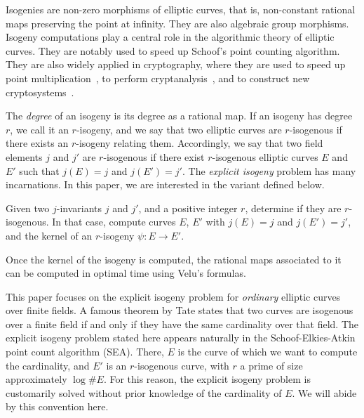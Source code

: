\documentclass{lms}
\begin{document}
Isogenies are non-zero morphisms of elliptic curves, that is,
non-constant rational maps preserving the point at infinity. They are
also algebraic group morphisms. Isogeny computations play a central
role in the algorithmic theory of elliptic curves. They are notably
used to speed up Schoof's point counting
algorithm\cite{schoof85,atkin88,elkies92,schoof95,elkies98}. They are
also widely applied in cryptography, where they are used to speed up
point multiplication~\cite{gallant+lambert+vanstone01,birkner+sica11},
to perform cryptanalysis~\cite{mauer+menezes+teske01}, and to
construct new
cryptosystems~\cite{teske06,charles+lauter+goren09,Stol,defeo+jao+plut12,jao+soukharev2014-signatures}.

The \emph{degree} of an isogeny is its degree as a rational map. If an
isogeny has degree $r$, we call it an $r$-isogeny, and we say that two
elliptic curves are $r$-isogenous if there exists an $r$-isogeny
relating them. Accordingly, we say that two field elements $j$ and
$j'$ are $r$-isogenous if there exist $r$-isogenous elliptic curves
$E$ and $E'$ such that $j(E)=j$ and $j(E')=j'$. The
\emph{explicit isogeny} problem has many incarnations. In this paper,
we are interested in the variant defined below.

\begin{prob} \label{prob:isogeny-problem}
  Given two $j$-invariants $j$ and $j'$, and a positive integer
  $r$, determine if they are $r$-isogenous. In that case, compute
  curves $E$, $E'$ with $j(E)=j$ and $j(E')=j'$, and the
  kernel of an $r$-isogeny $ψ:E\to E'$.
\end{prob}

Once the kernel of the isogeny is computed, the rational maps
associated to it can be computed in optimal time using Velu's
formulas\cite{velu71}.

This paper focuses on the explicit isogeny problem for \emph{ordinary}
elliptic curves over finite fields. A famous theorem by Tate states
that two curves are isogenous over a finite field if and only if they
have the same cardinality over that field. The explicit isogeny
problem stated here appears naturally in the Schoof-Elkies-Atkin point
count algorithm (SEA). There, $E$ is the curve of which we want to
compute the cardinality, and $E'$ is an $r$-isogenous curve, with $r$
a prime of size approximately $\log\#E$. For this reason, the explicit
isogeny problem is customarily solved without prior knowledge of the
cardinality of $E$. We will abide by this convention here.
\end{document}
